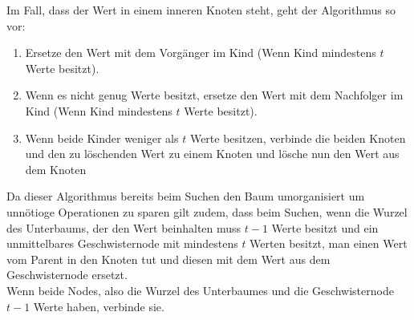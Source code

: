 \documentclass[
../../AuD-Zusammenfassung.tex,
]
{subfiles}
\begin{document}
\begin{minipage}[t]{\textwidth}
    \centering
    Im Fall, dass der Wert in einem inneren Knoten steht, geht der Algorithmus so vor:
    \begin{enumerate}
        \item Ersetze den Wert mit dem Vorgänger im Kind (Wenn Kind mindestens $t$ Werte besitzt).
        \item Wenn es nicht genug Werte besitzt, ersetze den Wert mit dem Nachfolger im Kind (Wenn Kind mindestens $t$ Werte besitzt).
        \item Wenn beide Kinder weniger als $t$ Werte besitzen, verbinde die beiden Knoten und den zu löschenden Wert zu einem Knoten und lösche nun den Wert aus dem Knoten
    \end{enumerate}
    Da dieser Algorithmus bereits beim Suchen den Baum umorganisiert um unnötioge Operationen zu sparen gilt zudem, dass beim Suchen, wenn die Wurzel des Unterbaums, der den Wert beinhalten muss $t - 1$ Werte besitzt und ein unmittelbares Geschwisternode mit mindestens $t$ Werten besitzt, man einen Wert vom Parent in den Knoten tut und diesen mit dem Wert aus dem Geschwisternode ersetzt.\\
    Wenn beide Nodes, also die Wurzel des Unterbaumes und die Geschwisternode $t - 1$ Werte haben, verbinde sie.
\end{minipage}
\end{document}
